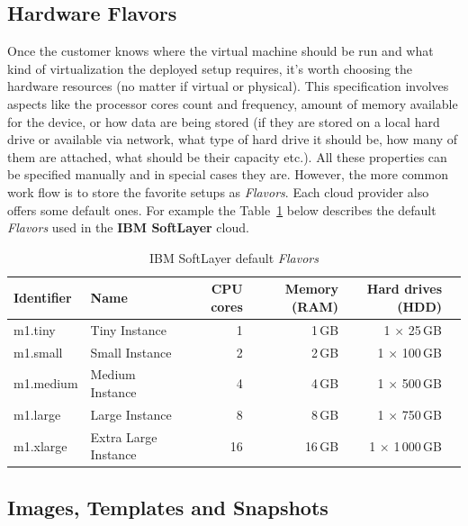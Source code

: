 \subsection{Hardware Flavors}
\label{sub:Hardware Flavors}

Once the customer knows where the virtual machine should be run and what kind of virtualization the deployed setup requires, it's worth choosing the hardware resources (no matter if virtual or physical). This specification involves aspects like the processor cores count and frequency, amount of memory available for the device, or how data are being stored (if they are stored on a local hard drive or available via network, what type of hard drive it should be, how many of them are attached, what should be their capacity etc.). All these properties can be specified manually and in special cases they are. However, the more common work flow is to store the favorite setups as \emph{Flavors}. Each cloud provider also offers some default ones. For example the Table~\ref{tab:IBM SoftLayer default Flavors} below describes the default \emph{Flavors} used in the \textbf{IBM SoftLayer} cloud.

\begin{table}[ht]
	\centering
	\caption{IBM SoftLayer default \emph{Flavors}}\label{tab:IBM SoftLayer default Flavors}
	\begin{tabular}{llrrrr}
		\toprule
		Identifier & Name                 & CPU cores & Memory (RAM) & Hard drives (HDD)     \\
		\midrule
		m1.tiny    & Tiny Instance        & 1         & 1\,GB        & 1 $\times$ 25\,GB     \\
		m1.small   & Small Instance       & 2         & 2\,GB        & 1 $\times$ 100\,GB    \\
		m1.medium  & Medium Instance      & 4         & 4\,GB        & 1 $\times$ 500\,GB    \\
		m1.large   & Large Instance       & 8         & 8\,GB        & 1 $\times$ 750\,GB    \\
		m1.xlarge  & Extra Large Instance & 16        & 16\,GB       & 1 $\times$ 1\,000\,GB \\
		\bottomrule
	\end{tabular}
\end{table}

\subsection{Images, Templates and Snapshots}
\label{sub:Images, Templates and Snapshots}

